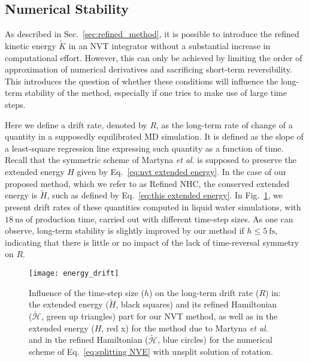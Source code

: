 \documentclass[
	aip,
	jcp,
	reprint,
]{revtex4-1}
\newcommand{\Ham}[1]{{\mathcal H}_\text{#1}}           %
\newcommand{\timestep}{h}
\newcommand{\refined}[1]{\widetilde{#1}}
\begin{document}
\subsection{Numerical Stability}
\label{sec:numerical stability}

As described in Sec.~\ref{sec:refined_method}, it is possible to introduce the refined kinetic energy $\refined K$ in an NVT integrator without a substantial increase in computational effort.
However, this can only be achieved by limiting the order of approximation of numerical derivatives and sacrificing short-term reversibility.
This introduces the question of whether these conditions will influence the long-term stability of the method, especially if one tries to make use of large time steps.

Here we define a drift rate, denoted by $R$, as the long-term rate of change of a quantity in a supposedly equilibrated MD simulation.
It is defined as the slope of a least-square regression line expressing such quantity as a function of time.
Recall that the symmetric scheme of Martyna \textit{et al}. \cite{Martyna_1996} is supposed to preserve the extended energy $H$ given by Eq.~\eqref{eq:nvt extended energy}.
In the case of our proposed method, which we refer to as Refined NHC, the conserved extended energy is $\refined H$, such as defined by Eq.~\eqref{eq:this extended energy}.
In Fig.~\ref{fig:energy_drift}, we present drift rates of these quantities computed in liquid water simulations, with $18~\text{ns}$ of production time, carried out with different time-step sizes.
As one can observe, long-term stability is slightly improved by our method if $\timestep \le 5~\text{fs}$, indicating that there is little or no impact of the lack of time-reversal symmetry on $R$.

\begin{figure}
	\texttt{[image: energy\_drift]}
	\caption{Influence of the time-step size ($\timestep$) on the long-term drift rate ($R$) in: the extended energy ($\refined{H}$, black squares) and its refined Hamiltonian ($\refined{\Ham{}}$, green up triangles) part for our NVT method, as well as in the extended energy ($H$, red x) for the method due to Martyna \textit{et al}. \cite{Martyna_1996} and in the refined Hamiltonian ($\refined{\Ham{}}$, blue circles) for the numerical scheme of Eq.~\eqref{eq:splitting NVE} with unsplit solution of rotation.}
	\label{fig:energy_drift}
\end{figure}
\end{document}
